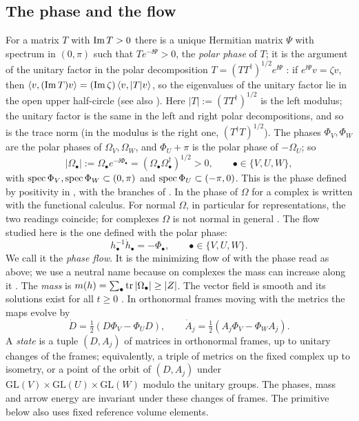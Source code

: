 \subsection{The phase and the flow}
For a matrix $T$ with $\operatorname{Im} T>0$ there is a unique Hermitian matrix $\Psi$
with spectrum in $(0,\pi)$ such that $Te^{-\ii\Psi}>0$, the \emph{polar phase}
of $T$; it is the argument of the unitary factor in the polar decomposition
$T=(TT^\dagger)^{1/2}e^{\ii\Psi}$ \cite[Section~7.3]{hj13}: if
$e^{\ii\Psi}v=\zeta v$, then
$\left\langle v,(\operatorname{Im} T)v\right\rangle=(\operatorname{Im}\zeta)\left\langle v,|T|v\right\rangle$, so the eigenvalues of the
unitary factor lie in the open upper half-circle (see also
\cite[Lemma~2.2]{wue26}). Here
$|T|:=(TT^\dagger)^{1/2}$ is the left modulus; the unitary factor is the same
in the left and right polar decompositions, and so is the trace norm (in
\cite{bha97} the modulus is the right one, $(T^\dagger T)^{1/2}$). The phases
$\Phi_V,\Phi_W$ are the polar phases of $\Omega_V,\Omega_W$, and
$\Phi_U+\pi$ is the polar phase of $-\Omega_U$; so
\begin{equation}\label{eq:phase}
 |\Omega_\bullet|:=\Omega_\bullet e^{-\ii\Phi_\bullet}
 =(\Omega_\bullet\Omega_\bullet^\dagger)^{1/2}>0,\qquad\bullet\in\{V,U,W\},
\end{equation}
with $\operatorname{spec}\Phi_V,\operatorname{spec}\Phi_W\subset(0,\pi)$ and
$\operatorname{spec}\Phi_U\subset(-\pi,0)$. This is the phase defined by positivity in
\cite[\S4.2]{hkkp26}, with the branches of \cite[(5.15)]{hkkp26}. In
\cite[\S5.4]{hkkp26} the phase of $\Omega$ for a complex is written with the
functional calculus. For normal $\Omega$, in particular for
representations, the two readings coincide; for complexes $\Omega$ is not
normal in general \cite[Example~2.3]{wue26}. The flow studied here is the
one defined with the polar phase:
\begin{equation}\label{eq:flow}
 h_\bullet^{-1}\dot h_\bullet=-\Phi_\bullet,\qquad\bullet\in\{V,U,W\}.
\end{equation}
We call it the \emph{phase flow}. It is the minimizing flow of
\cite[\S4.1]{hkkp26} with the phase read as above; we use a neutral name
because on complexes the mass can increase along it
\cite[Theorem~1.1]{wue26}. The \emph{mass} is $m(h)=\sum_\bullet\operatorname{tr}|\Omega_\bullet|\geq|Z|$. The
vector field is smooth and its solutions exist for all $t\geq0$
\cite[Lemma~2.4]{wue26}. In orthonormal frames moving with the metrics the
maps evolve by
\begin{equation}\label{eq:mapflow}
 \dot D=\tfrac12(D\Phi_V-\Phi_UD),\qquad
 \dot A_j=\tfrac12(A_j\Phi_V-\Phi_WA_j).
\end{equation}
A \emph{state} is a tuple $(D,A_j)$ of matrices in orthonormal frames, up to
unitary changes of the frames; equivalently, a triple of metrics on the
fixed complex up to isometry, or a point of the orbit of $(D,A_j)$ under
$\mathrm{GL}(V)\times\mathrm{GL}(U)\times\mathrm{GL}(W)$ modulo the unitary
groups. The phases, mass and arrow energy are invariant under these changes of frames. The primitive below also uses fixed reference volume elements.

